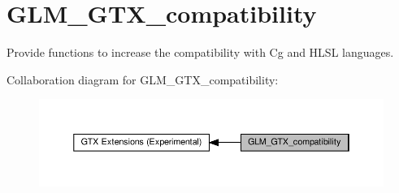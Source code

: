 \hypertarget{group__gtx__compatibility}{}\section{G\+L\+M\+\_\+\+G\+T\+X\+\_\+compatibility}
\label{group__gtx__compatibility}


Provide functions to increase the compatibility with Cg and H\+L\+SL languages.  


Collaboration diagram for G\+L\+M\+\_\+\+G\+T\+X\+\_\+compatibility\+:\nopagebreak
\begin{figure}[H]
\begin{center}
\leavevmode
\includegraphics[width=350pt]{group__gtx__compatibility}
\end{center}
\end{figure}

